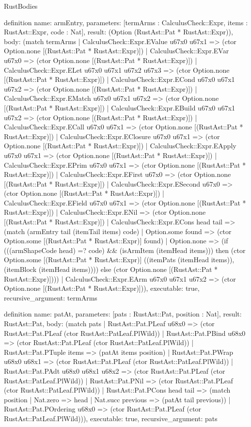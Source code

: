 \begin{lexlean}{RustBodies}
\begin{semanticmodule}
definition{
  name: armEntry,
  parameters: [termArms : CalculusCheck::Expr, items : RustAst::Expr, code : Nat],
  result: (Option (RustAst::Pat * RustAst::Expr)),
  body: (match termArms
    | CalculusCheck::Expr.EValue u67x0 u67x1 => (ctor Option.none [(RustAst::Pat * RustAst::Expr)])
    | CalculusCheck::Expr.EVar u67x0 => (ctor Option.none [(RustAst::Pat * RustAst::Expr)])
    | CalculusCheck::Expr.ELet u67x0 u67x1 u67x2 u67x3 => (ctor Option.none [(RustAst::Pat * RustAst::Expr)])
    | CalculusCheck::Expr.ECond u67x0 u67x1 u67x2 => (ctor Option.none [(RustAst::Pat * RustAst::Expr)])
    | CalculusCheck::Expr.EMatch u67x0 u67x1 u67x2 => (ctor Option.none [(RustAst::Pat * RustAst::Expr)])
    | CalculusCheck::Expr.EBuild u67x0 u67x1 u67x2 => (ctor Option.none [(RustAst::Pat * RustAst::Expr)])
    | CalculusCheck::Expr.ECall u67x0 u67x1 => (ctor Option.none [(RustAst::Pat * RustAst::Expr)])
    | CalculusCheck::Expr.EClosure u67x0 u67x1 => (ctor Option.none [(RustAst::Pat * RustAst::Expr)])
    | CalculusCheck::Expr.EApply u67x0 u67x1 => (ctor Option.none [(RustAst::Pat * RustAst::Expr)])
    | CalculusCheck::Expr.EPrim u67x0 u67x1 => (ctor Option.none [(RustAst::Pat * RustAst::Expr)])
    | CalculusCheck::Expr.EFirst u67x0 => (ctor Option.none [(RustAst::Pat * RustAst::Expr)])
    | CalculusCheck::Expr.ESecond u67x0 => (ctor Option.none [(RustAst::Pat * RustAst::Expr)])
    | CalculusCheck::Expr.EField u67x0 u67x1 => (ctor Option.none [(RustAst::Pat * RustAst::Expr)])
    | CalculusCheck::Expr.ENil => (ctor Option.none [(RustAst::Pat * RustAst::Expr)])
    | CalculusCheck::Expr.ECons head tail => (match (armEntry tail (itemTail items) code)
      | Option.some found => (ctor Option.some [(RustAst::Pat * RustAst::Expr)] found)
      | Option.none => (if (((armShapeCode head) =? code) && (isArmItem (itemHead items))) then (ctor Option.some [(RustAst::Pat * RustAst::Expr)] ((itemPats (itemHead items)), (itemBlock (itemHead items)))) else (ctor Option.none [(RustAst::Pat * RustAst::Expr)])))
    | CalculusCheck::Expr.EArm u67x0 u67x1 u67x2 => (ctor Option.none [(RustAst::Pat * RustAst::Expr)])),
  executable: true,
  recursive_argument: termArms
}

definition{
  name: patAt,
  parameters: [pats : RustAst::Pat, position : Nat],
  result: RustAst::Pat,
  body: (match pats
    | RustAst::Pat.PLeaf u68x0 => (ctor RustAst::Pat.PLeaf (ctor RustAst::PatLeaf.PlWild))
    | RustAst::Pat.PBind u68x0 => (ctor RustAst::Pat.PLeaf (ctor RustAst::PatLeaf.PlWild))
    | RustAst::Pat.PTuple items => (patAt items position)
    | RustAst::Pat.PWrap u68x0 u68x1 => (ctor RustAst::Pat.PLeaf (ctor RustAst::PatLeaf.PlWild))
    | RustAst::Pat.PAdt u68x0 u68x1 u68x2 => (ctor RustAst::Pat.PLeaf (ctor RustAst::PatLeaf.PlWild))
    | RustAst::Pat.PNil => (ctor RustAst::Pat.PLeaf (ctor RustAst::PatLeaf.PlWild))
    | RustAst::Pat.PCons head tail => (match position
      | Nat.zero => head
      | Nat.succ previous => (patAt tail previous))
    | RustAst::Pat.POrdering u68x0 => (ctor RustAst::Pat.PLeaf (ctor RustAst::PatLeaf.PlWild))),
  executable: true,
  recursive_argument: pats
}


\end{semanticmodule}
\end{lexlean}
